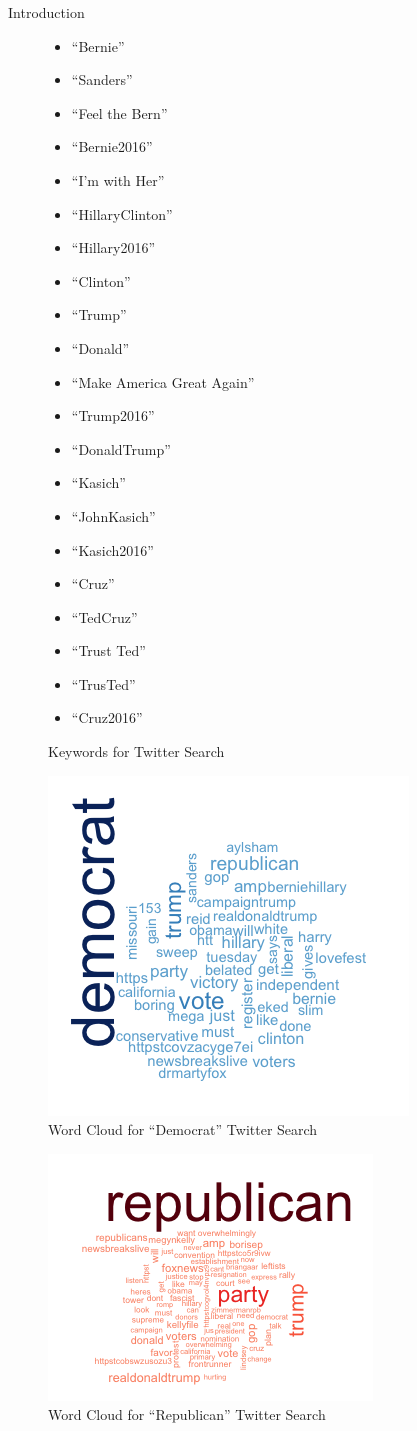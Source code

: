 \documentclass[final]{beamer}
\newlength{\onecolwid}
\begin{document}
\begin{frame}[t]
\begin{columns}[t]
\begin{column}{\onecolwid}
\begin{block}{Introduction}
	\begin{figure}
\begin{multicols}{3}
\footnotesize{\begin{itemize}
	\item ``Bernie''
	\item ``Sanders''
	\item ``Feel the Bern''
	\item ``Bernie2016''
	\item ``I'm with Her''
	\item ``HillaryClinton''
	\item ``Hillary2016''
	\item ``Clinton''
	\item ``Trump''
	\item ``Donald''
	\item ``Make America Great Again''
	\item ``Trump2016''
	\item ``DonaldTrump''
	\item ``Kasich''
	\item ``JohnKasich''
	\item ``Kasich2016''
	\item ``Cruz''
	\item ``TedCruz''
	\item ``Trust Ted''
	\item ``TrusTed''
	\item ``Cruz2016''
\end{itemize}}
\end{multicols}
\caption{Keywords for Twitter Search}
\end{figure}
	\begin{figure}
		\includegraphics[width=0.45\linewidth]{images/newwordclouddem}
		\caption{Word Cloud for ``Democrat'' Twitter Search}	
	\end{figure}
	\begin{figure}
		\includegraphics[width=0.45\linewidth]{images/newwordcloudrep}
		\caption{Word Cloud for ``Republican'' Twitter Search}
	\end{figure}




\end{block}
\end{column}
\end{columns}
\end{frame}
\end{document}

